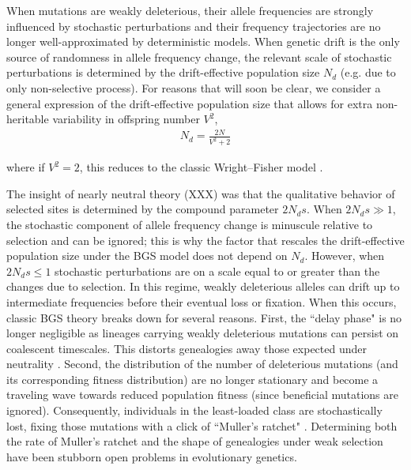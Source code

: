 \documentclass[11pt]{article}
\begin{document}
When mutations are weakly deleterious, their allele frequencies are strongly
influenced by stochastic perturbations and their frequency trajectories are no
longer well-approximated by deterministic models. When genetic drift is the
only source of randomness in allele frequency change, the relevant scale of
stochastic perturbations is determined by the drift-effective population size
$N_d$ (e.g. due to only non-selective process). For reasons that will soon be
clear, we consider a general expression of the drift-effective population size
that allows for extra non-heritable variability in offspring number $V^2$,
%
\begin{align}
    N_d = \frac{2N}{V^2 + 2}
\end{align}

where if $V^2 = 2$, this reduces to the classic Wright--Fisher model
\parencite{Wright1938-tv}.

The insight of nearly neutral theory (XXX) was that the qualitative behavior of
selected sites is determined by the compound parameter $2N_d s$. When $2N_d s
\gg 1$, the stochastic component of allele frequency change is minuscule
relative to selection and can be ignored; this is why the factor that rescales
the drift-effective population size under the BGS model does not depend on
$N_d$. However, when $2N_d s \le 1$ stochastic perturbations are on a scale
equal to or greater than the changes due to selection. In this regime, weakly
deleterious alleles can drift up to intermediate frequencies before their
eventual loss or fixation. When this occurs, classic BGS theory breaks down for
several reasons. First, the ``delay phase" is no longer negligible as lineages
carrying weakly deleterious mutations can persist on coalescent timescales.
This distorts genealogies away those expected under neutrality
\parencite{Przeworski1999-mb,OFallon2010-my,Higgs1995-xc}. Second, the
distribution of the number of deleterious mutations (and its corresponding
fitness distribution) are no longer stationary and become a traveling wave
\parencite{Rouzine2008-qz,Good2013-lp,Gessler1995-hz} towards reduced
population fitness (since beneficial mutations are ignored). Consequently,
individuals in the least-loaded class are stochastically lost, fixing those
mutations with a click of ``Muller's ratchet" \parencite{Muller1964-ki}.
Determining both the rate of Muller's ratchet
\parencite{Haigh1978-gt,Gordo2002-dr,Gessler1995-hz} and the shape of
genealogies under weak selection have been stubborn open problems in
evolutionary genetics.
\end{document}
